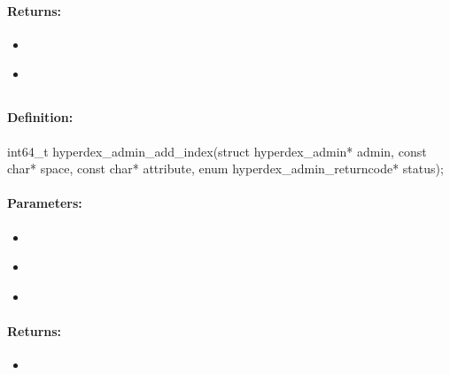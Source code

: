 \paragraph{Returns:}
\begin{itemize}[noitemsep]
\item {}\\

\item {}\\

\end{itemize}

\pagebreak
\subsection{}
\label{api:c:add_index}


\paragraph{Definition:}
\begin{ccode}
int64_t hyperdex_admin_add_index(struct hyperdex_admin* admin,
        const char* space,
        const char* attribute,
        enum hyperdex_admin_returncode* status);
\end{ccode}

\paragraph{Parameters:}
\begin{itemize}[noitemsep]
\item {}\\

\item {}\\

\item {}\\

\end{itemize}

\paragraph{Returns:}
\begin{itemize}[noitemsep]
\item {}\\

\end{itemize}

